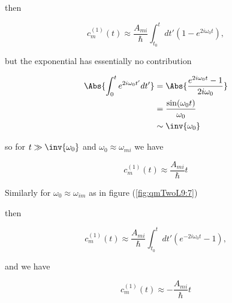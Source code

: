 then

\begin{equation}\label{eqn:qmTwoL9:550}
c_m^{(1)}(t) \approx
\frac{A_{mi}}{\hbar} \int_{t_0}^t dt' 
\left( 
1
-e^{2 i \omega_0 t }
\right),
\end{equation}

but the exponential has essentially no contribution

\begin{align*}
\Abs{\int_0^t e^{2 i \omega_0 t'} dt' } 
&= 
\Abs{\frac{e^{2 i \omega_0 t} -1 }{2 i \omega_0}}  \\
&= 
\frac{\sin(\omega_0 t)}{\omega_0} \\
&\sim \inv{\omega_0}
\end{align*}

so for $t \gg \inv{\omega_0}$ and $\omega_0 \approx \omega_{mi}$ we have 

\begin{equation}\label{eqn:qmTwoL9:570}
c_m^{(1)}(t) \approx \frac{A_{mi}}{\hbar} t
\end{equation}

Similarly for $\omega_0 \approx \omega_{im}$ as in figure (\ref{fig:qmTwoL9:7}) 


then

\begin{equation}\label{eqn:qmTwoL9:590}
c_m^{(1)}(t) \approx
\frac{A_{mi}}{\hbar} \int_{t_0}^t dt' 
\left( 
e^{-2 i \omega_0 t }
-1
\right),
\end{equation}

and we have

\begin{equation}\label{eqn:qmTwoL9:610}
c_m^{(1)}(t) \approx -\frac{A_{mi}}{\hbar} t
\end{equation}


